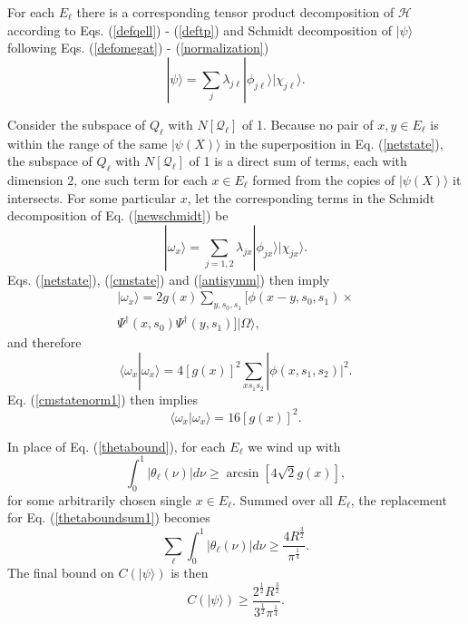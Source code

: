 \documentclass[12pt,amsmath,amssymb,onecolumn]{revtex4-2}
\begin{document}
For each $E_\ell$ there is a corresponding tensor product decomposition of $\mathcal{H}$
according to Eqs. (\ref{defqell}) - (\ref{deftp}) 
and Schmidt decomposition 
of $|\psi \rangle $ following Eqs. (\ref{defomegat}) - (\ref{normalization})
\begin{equation}
\label{newschmidt}
|\psi \rangle  = \sum_j \lambda_{j\ell} |\phi_{j\ell} \rangle |\chi_{j\ell} \rangle .
\end{equation}

Consider the subspace of $Q_\ell$ with $N[\mathcal{Q}_\ell]$ of 1. Because no pair
of $x, y \in E_\ell$ is within the range of the same $|\psi(X) \rangle $
in the superposition in Eq. (\ref{netstate}),
the subspace
of $Q_\ell$ with $N[\mathcal{Q}_\ell]$ of 1 is a direct sum of terms, each with
dimension 2, one such term
for each $x \in E_\ell$ formed from the copies of $|\psi(X) \rangle $ it intersects.
For some particular $x$, let the corresponding terms in the Schmidt decomposition
of Eq. (\ref{newschmidt}) be
\begin{equation}
\label{schmidtx}
|\omega_x \rangle  = \sum_{j = 1, 2} \lambda_{jx} |\phi_{jx} \rangle  |\chi_{jx} \rangle .
\end{equation}
Eqs. (\ref{netstate}), (\ref{cmstate}) and (\ref{antisymm}) then imply
\begin{multline}
\label{cmstate1}
|\omega_x \rangle  = 2 g(x) \sum_{y, s_0, s_1} [\phi(x -y, s_0, s_1) \times \\
\Psi^{\dagger}(x,s_0)\Psi^{\dagger}(y,s_1) ]  |\Omega \rangle ,
\end{multline}
and therefore
\begin{equation}
\label{omeganorm0}
 \langle \omega_x | \omega_x \rangle  = 4 [g(x)]^2 \sum_{x s_1 s_2} |\phi(x, s_1, s_2)|^2.
\end{equation}
Eq. (\ref{cmstatenorm1}) then implies
\begin{equation}
\label{omeganorm}
 \langle \omega_x | \omega_x \rangle  = 16 [g(x)]^2.
\end{equation}

In place of Eq. (\ref{thetabound}), for each $E_\ell$ we wind up with
\begin{equation}
\label{thetaboundnew}
\int_0^1 | \theta_{\ell}(\nu)| d \nu
\ge \arcsin[4\sqrt{2} g( x)],
\end{equation}
for some arbitrarily chosen single $x \in E_\ell$.
Summed over all $E_\ell$, the replacement for
Eq. (\ref{thetaboundsum1}) becomes 
\begin{equation}
\label{thetaboundsumnew}
\sum_{\ell}\int_0^1 | \theta_{\ell}(\nu)| d \nu  
\ge \frac{4R^\frac{3}{2}} {\pi^\frac{1}{4}}.
\end{equation} 
The final bound on $C(|\psi \rangle )$ is then
\begin{equation}
\label{finalboundnew}
C( |\psi \rangle ) \ge \frac{2^\frac{1}{2}R^\frac{3}{2}}{ 3^\frac{1}{2} \pi^\frac{1}{4}}.
\end{equation}
\end{document}
